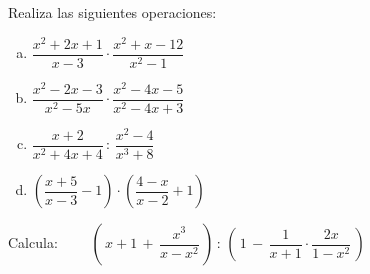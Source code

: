 \vspace{-8mm}
\begin{flushright}
	\begin{footnotesize} \textcolor{gris}{}	\end{footnotesize}
\end{flushright}

\begin{mipropuesto}

Realiza las siguientes operaciones:

\begin{multicols}{2}
\begin{enumerate}[a) ]
\item $\dfrac{x^2+2x+1}{x-3}\cdot \dfrac{x^2+x-12}{x^2-1}$
\item $\dfrac{x^2-2x-3}{x^2-5x}\cdot \dfrac{x^2-4x-5}{x^2-4x+3}$
\item $\dfrac{x+2}{x^2+4x+4}\, : \, \dfrac{x^2-4}{x^3+8}$
\item $\left( \dfrac{x+5}{x-3} -1\right)\cdot \left( \dfrac{4-x}{x-2}+1\right)$
\end{enumerate}	
\end{multicols}
\vspace{1mm}	
\end{mipropuesto}

\vspace{-8mm}
\begin{flushright}
	\begin{footnotesize} \textcolor{gris}{}	\end{footnotesize}
\end{flushright}

\begin{mipropuesto}

Calcula:
$\qquad \left( \, x+1\, + \, \dfrac{x^3}{x-x^2} \, \right) \, : \, \left( \, 1\, -\, \dfrac{1}{x+1} \cdot \dfrac{2x}{1-x^2} \, \right)$
\end{mipropuesto}

\vspace{-8mm}
\begin{flushright}
	\begin{footnotesize} \textcolor{gris}{}	\end{footnotesize}
\end{flushright}


